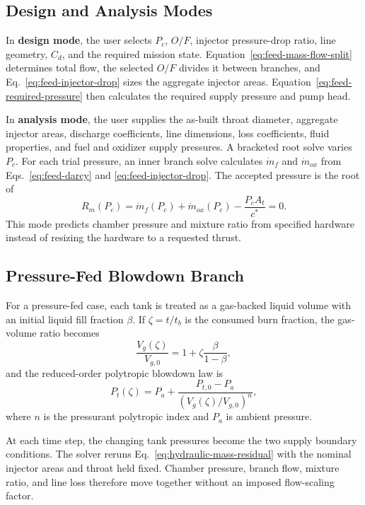 \documentclass[11pt]{article}
\begin{document}
\subsection{Design and Analysis Modes}
In \textbf{design mode}, the user selects $P_c$, $O/F$, injector pressure-drop ratio, line geometry, $C_d$, and the required mission state. Equation~\eqref{eq:feed-mass-flow-split} determines total flow, the selected $O/F$ divides it between branches, and Eq.~\eqref{eq:feed-injector-drop} sizes the aggregate injector areas. Equation~\eqref{eq:feed-required-pressure} then calculates the required supply pressure and pump head.

In \textbf{analysis mode}, the user supplies the as-built throat diameter, aggregate injector areas, discharge coefficients, line dimensions, loss coefficients, fluid properties, and fuel and oxidizer supply pressures. A bracketed root solve varies $P_c$. For each trial pressure, an inner branch solve calculates $\dot m_f$ and $\dot m_{ox}$ from Eqs.~\eqref{eq:feed-darcy} and \eqref{eq:feed-injector-drop}. The accepted pressure is the root of
\begin{equation}
R_m(P_c)=\dot m_f(P_c)+\dot m_{ox}(P_c)-\frac{P_cA_t}{c^*}=0.
\label{eq:hydraulic-mass-residual}
\end{equation}
This mode predicts chamber pressure and mixture ratio from specified hardware instead of resizing the hardware to a requested thrust.

\subsection{Pressure-Fed Blowdown Branch}
For a pressure-fed case, each tank is treated as a gas-backed liquid volume with an initial liquid fill fraction $\beta$. If $\zeta=t/t_b$ is the consumed burn fraction, the gas-volume ratio becomes
\begin{equation}
\frac{V_g(\zeta)}{V_{g,0}}
=
1+\zeta\frac{\beta}{1-\beta},
\label{eq:blowdown-volume-ratio}
\end{equation}
and the reduced-order polytropic blowdown law is
\begin{equation}
P_t(\zeta)
=
P_a+\frac{P_{t,0}-P_a}{\left(V_g(\zeta)/V_{g,0}\right)^n},
\label{eq:blowdown-pressure}
\end{equation}
where $n$ is the pressurant polytropic index and $P_a$ is ambient pressure.

At each time step, the changing tank pressures become the two supply boundary conditions. The solver reruns Eq.~\eqref{eq:hydraulic-mass-residual} with the nominal injector areas and throat held fixed. Chamber pressure, branch flow, mixture ratio, and line loss therefore move together without an imposed flow-scaling factor.
\end{document}

